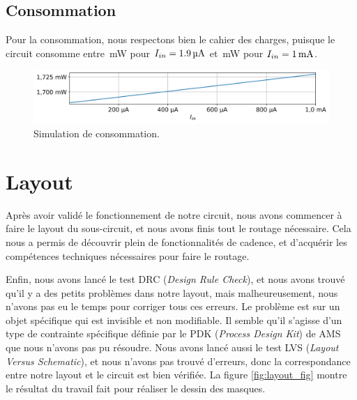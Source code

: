 \documentclass[a4paper,12pt]{article}
\numberwithin{equation}{section}
\newcommand{\?}{\stackrel{?}{=}}
\newcommand{\sis}[2]{\complexnum{#1}\,\si[per-mode=symbol]{#2}}
\begin{document}
\subsection{Consommation}

Pour la consommation, nous respectons bien le cahier des charges, puisque le circuit consomme entre \sis{1.68203}{\milli\watt} pour $I_{in}=\sis{1.9}{\micro\ampere}$ et \sis{1.7297}{\milli\watt} pour $I_{in}=\sis{1}{\milli\ampere}$.

\begin{figure}[htp!]
    \centering
    \includegraphics[width=\linewidth]{images/power.png}
    \caption{Simulation de consommation.}
    \label{fig:power}
\end{figure}

\FloatBarrier
\newpage
\section{Layout}

Après avoir validé le fonctionnement de notre circuit, nous avons commencer à faire le layout du sous-circuit, et nous avons finis tout le routage nécessaire. Cela nous a permis de découvrir plein de fonctionnalités de cadence, et d'acquérir les compétences techniques nécessaires pour faire le routage.

Enfin, nous avons lancé le test DRC (\textit{Design Rule Check}), et nous avons trouvé qu'il y a des petits problèmes dans notre layout, mais malheureusement, nous n'avons pas eu le temps pour corriger tous ces erreurs. Le problème est sur un objet spécifique qui est invisible et non modifiable. Il semble qu'il s'agisse d'un type de contrainte spécifique définie par le PDK (\textit{Process Design Kit}) de AMS que nous n'avons pas pu résoudre. Nous avons lancé aussi le test LVS (\textit{Layout Versus Schematic}), et nous n'avons pas trouvé d'erreurs, donc la correspondance entre notre layout et le circuit est bien vérifiée. La figure \ref{fig:layout_fig} montre le résultat du travail fait pour réaliser le dessin des masques.
\end{document}
